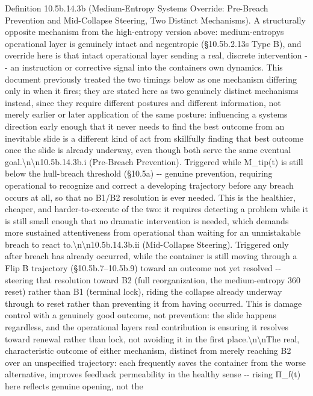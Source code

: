 \documentclass[
]{article}
\begin{document}
Definition 10.5b.14.3b (Medium-Entropy Systems Override: Pre-Breach
Prevention and Mid-Collapse Steering, Two Distinct Mechanisms). A
structurally opposite mechanism from the high-entropy version above:
medium-entropys operational layer is genuinely intact and negentropic
(§10.5b.2.13s Type B), and override here is that intact operational
layer sending a real, discrete intervention -\/- an instruction or
corrective signal into the containers own dynamics. This document
previously treated the two timings below as one mechanism differing only
in when it fires; they are stated here as two genuinely distinct
mechanisms instead, since they require different postures and different
information, not merely earlier or later application of the same
posture: influencing a systems direction early enough that it never
needs to find the best outcome from an inevitable slide is a different
kind of act from skillfully finding that best outcome once the slide is
already underway, even though both serve the same eventual
goal.\textbackslash n\textbackslash n10.5b.14.3b.i (Pre-Breach
Prevention). Triggered while M\_tip(t) is still below the hull-breach
threshold (§10.5a) -\/- genuine prevention, requiring operational to
recognize and correct a developing trajectory before any breach occurs
at all, so that no B1/B2 resolution is ever needed. This is the
healthier, cheaper, and harder-to-execute of the two: it requires
detecting a problem while it is still small enough that no dramatic
intervention is needed, which demands more sustained attentiveness from
operational than waiting for an unmistakable breach to react
to.\textbackslash n\textbackslash n10.5b.14.3b.ii (Mid-Collapse
Steering). Triggered only after breach has already occurred, while the
container is still moving through a Flip B trajectory
(§10.5b.7--10.5b.9) toward an outcome not yet resolved -\/- steering
that resolution toward B2 (full reorganization, the medium-entropy 360
reset) rather than B1 (terminal lock), riding the collapse already
underway through to reset rather than preventing it from having
occurred. This is damage control with a genuinely good outcome, not
prevention: the slide happens regardless, and the operational layers
real contribution is ensuring it resolves toward renewal rather than
lock, not avoiding it in the first
place.\textbackslash n\textbackslash nThe real, characteristic outcome
of either mechanism, distinct from merely reaching B2 over an
unspecified trajectory: each frequently saves the container from the
worse alternative, improves feedback permeability in the healthy sense
-\/- rising Π\_f(t) here reflects genuine opening, not the
\end{document}
